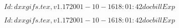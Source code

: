 \documentclass{article}
\begin{document}
$Id: dxxgifs.tex,v 1.17 2001-10-16 18:01:42 docbill Exp $


\pagebreak


$Id: dxxgifs.tex,v 1.17 2001-10-16 18:01:42 docbill Exp $


\pagebreak
\end{document}
